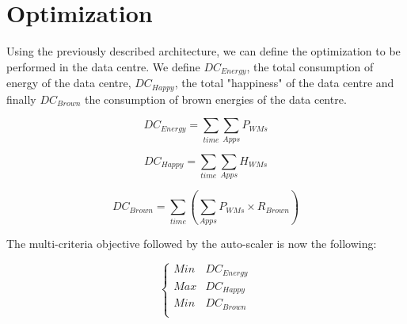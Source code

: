 \section{Optimization}
\label{sec:optim}

Using the previously described architecture, we can define the optimization to be performed in the data centre.
We define $DC_{Energy}$, the total consumption of energy of the data centre, $DC_{Happy}$, the total "happiness" of the data centre and finally $DC_{Brown}$ the consumption of brown energies of the data centre.

\begin{equation}
DC_{Energy} =\sum_{time} \sum_{Apps} P_{WMs}
\label{eq:DCen}
\end{equation}

\begin{equation}
DC_{Happy} =\sum_{time} \sum_{Apps} H_{WMs}
\label{eq:DChappy}
\end{equation}

\begin{equation}
DC_{Brown} =\sum_{time} (\sum_{Apps} P_{WMs} \times R_{Brown})
\label{eq:DCbrown}
\end{equation}

The multi-criteria objective followed by the auto-scaler is now the following:

\begin{equation}
\left\{
  \begin{array}{rcr}
    Min & DC_{Energy} \\
    Max & DC_{Happy}  \\
    Min & DC_{Brown}  \\
  \end{array}
\right.
\label{eq:DCbrown}
\end{equation}
